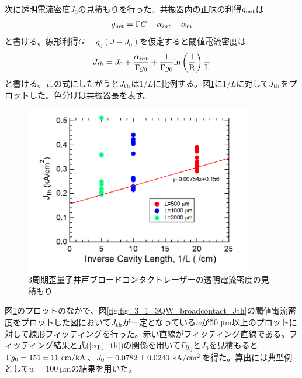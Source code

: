 {次に透明電流密度$J_{0}$の見積もりを行った。共振器内の正味の利得$g_{\rm{net}}$は
\begin{eqnarray}
g_{\rm{net}}=\Gamma G-\alpha_{int}-\alpha_{m}
\label{eq:eta_j0}
\end{eqnarray}
と書ける。線形利得$G=g_{0}(J-J_{0})$を仮定すると閾値電流密度は
\begin{eqnarray}
J_{th}=J_{0}+\dfrac{\alpha_{int}}{\Gamma g_{0}}+\dfrac{1}{\Gamma g_{0}}\rm{ln}\left(\dfrac{1}{R}\right)\dfrac{1}{L}
\label{eq:j_th}
\end{eqnarray}
と書ける。この式にしたがうと$J_{\rm{th}}$は$1/L$に比例する。図\ref{fig:fig_3_1_3QW_broadcontact_j0}に$1/L$に対して$J_{\rm{th}}$をプロットした。色分けは共振器長を表す。
\begin{figure}[h]
	\centering
	\includegraphics[width=10cm]{figure/fig_3_1_3QW_broadcontact_j0.png}
	\caption{3周期歪量子井戸ブロードコンタクトレーザーの透明電流密度の見積もり}
	\label{fig:fig_3_1_3QW_broadcontact_j0}
\end{figure}

図\ref{fig:fig_3_1_3QW_broadcontact_j0}のプロットのなかで、図\ref{fig:fig_3_1_3QW_broadcontact_Jth}の閾値電流密度をプロットした図において$J_{\rm{th}}$が一定となっている$w$が50 \si{\micro\metre}以上のプロットに対して線形フィッティングを行った。赤い直線がフィッティング直線である。フィッティング結果と式(\ref{eq:j_th})の関係を用いて$\Gamma g_{0}$と$J_{0}$を見積もると$\Gamma g_{0}=151 \pm 11\ \rm{ cm/kA}$、$J_{0}=0.0782 \pm 0.0240 \ \rm{kA/cm^{2}}$を得た。算出には典型例として$w=100\ \si{\micro\metre}$の結果を用いた。


}
